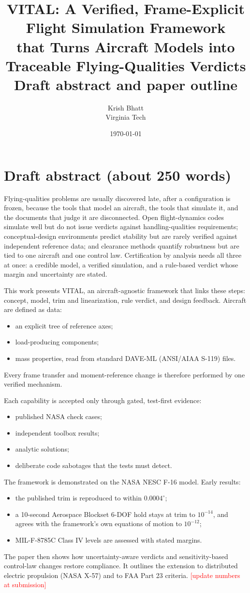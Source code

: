 \documentclass[11pt]{article}
\title{\textbf{VITAL: A Verified, Frame-Explicit Flight Simulation Framework\\
that Turns Aircraft Models into Traceable Flying-Qualities Verdicts}\\[4pt]
\large Draft abstract and paper outline}
\author{Krish Bhatt \\ Virginia Tech}
\date{\today}
\newcommand{\todo}[1]{\textcolor{red}{[#1]}}
\begin{document}
\maketitle

\section*{Draft abstract (about 250 words)}
Flying-qualities problems are usually discovered late, after a configuration
is frozen, because the tools that model an aircraft, the tools that simulate
it, and the documents that judge it are disconnected. Open flight-dynamics
codes simulate well but do not issue verdicts against handling-qualities
requirements; conceptual-design environments predict stability but are
rarely verified against independent reference data; and clearance methods
quantify robustness but are tied to one aircraft and one control law.
Certification by analysis needs all three at once: a credible model, a
verified simulation, and a rule-based verdict whose margin and uncertainty
are stated.

This work presents VITAL, an aircraft-agnostic framework that links these
steps: concept, model, trim and linearization, rule verdict, and design
feedback. Aircraft are defined as data:
\begin{itemize}
  \item an explicit tree of reference axes;
  \item load-producing components;
  \item mass properties, read from standard DAVE-ML (ANSI/AIAA S-119) files.
\end{itemize}
Every frame transfer and moment-reference change is therefore performed by
one verified mechanism.

Each capability is accepted only through gated, test-first evidence:
\begin{itemize}
  \item published NASA check cases;
  \item independent toolbox results;
  \item analytic solutions;
  \item deliberate code sabotages that the tests must detect.
\end{itemize}

The framework is demonstrated on the NASA NESC F-16 model. Early results:
\begin{itemize}
  \item the published trim is reproduced to within $0.0004^\circ$;
  \item a 10-second Aerospace Blockset 6-DOF hold stays at trim to
    $10^{-14}$, and agrees with the framework's own equations of motion
    to $10^{-12}$;
  \item MIL-F-8785C Class IV levels are assessed with stated margins.
\end{itemize}
The paper then shows how uncertainty-aware verdicts and sensitivity-based
control-law changes restore compliance. It outlines the extension to
distributed electric propulsion (NASA X-57) and to FAA Part 23 criteria.
\todo{update numbers at submission}
\end{document}
